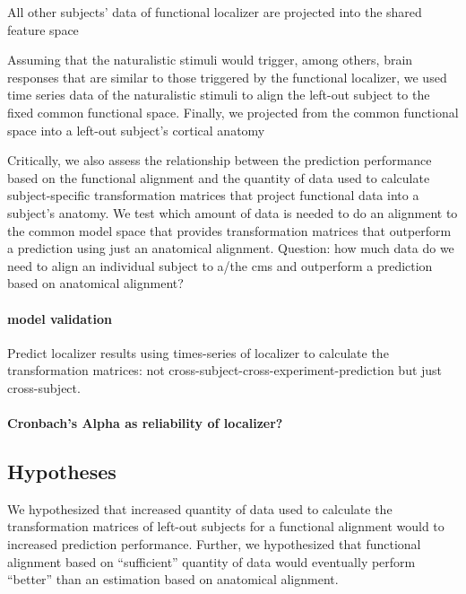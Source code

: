 All other subjects' data of functional localizer are projected into the shared
feature space

Assuming that the naturalistic stimuli would trigger, among others, brain
responses that are similar to those triggered by the functional localizer, we
used time series data of the naturalistic stimuli to align the left-out subject
to the fixed common functional space.
%
Finally, we projected from the common functional space into a left-out subject's
cortical anatomy

Critically, we also assess the relationship between the prediction performance
based on the functional alignment and the quantity of data used to calculate
subject-specific transformation matrices that project functional data into a
subject's anatomy.
%
We test which amount of data is needed to do an alignment to the common model
space that provides transformation matrices that outperform a prediction using
just an anatomical alignment.
%
Question: how much data do we need to align an individual subject to a/the
\ac{cms} and outperform a prediction based on anatomical alignment?


\paragraph{model validation}


Predict localizer results using times-series of localizer to calculate the
transformation matrices:
%
not cross-subject-cross-experiment-prediction but just cross-subject.


\paragraph{Cronbach's Alpha as reliability of localizer?}



\subsection{Hypotheses}
%
We hypothesized that increased quantity of data used to calculate the
transformation matrices of left-out subjects for a functional alignment would to
increased prediction performance.
%
Further, we hypothesized that functional alignment based on ``sufficient''
quantity of data would eventually perform ``better'' than an estimation based on
anatomical alignment.


